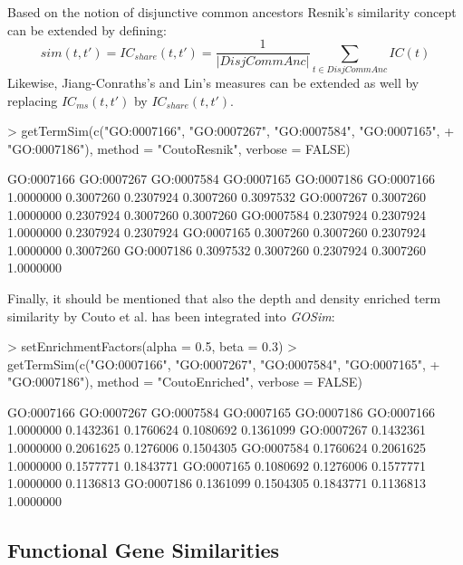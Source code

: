 \documentclass[12pt,a4paper]{article}
\begin{document}
Based on the notion of disjunctive common ancestors Resnik's similarity concept can be extended by defining:
\begin{equation}
sim(t,t') = IC_{share}(t,t') = \frac{1}{|DisjCommAnc|}\sum_{t\in DisjCommAnc} IC(t)
\end{equation}
Likewise, Jiang-Conraths's and Lin's measures can be extended as well by replacing $IC_{ms}(t,t')$ by $IC_{share}(t,t')$.
\begin{Schunk}
\begin{Sinput}
> getTermSim(c("GO:0007166", "GO:0007267", "GO:0007584", "GO:0007165", 
+     "GO:0007186"), method = "CoutoResnik", verbose = FALSE)
\end{Sinput}
\begin{Soutput}
           GO:0007166 GO:0007267 GO:0007584 GO:0007165 GO:0007186
GO:0007166  1.0000000  0.3007260  0.2307924  0.3007260  0.3097532
GO:0007267  0.3007260  1.0000000  0.2307924  0.3007260  0.3007260
GO:0007584  0.2307924  0.2307924  1.0000000  0.2307924  0.2307924
GO:0007165  0.3007260  0.3007260  0.2307924  1.0000000  0.3007260
GO:0007186  0.3097532  0.3007260  0.2307924  0.3007260  1.0000000
\end{Soutput}
\end{Schunk}

Finally, it should be mentioned that also the depth and density enriched term similarity by Couto et al. \cite{Couto2003FuSSiMeg} has been integrated into \emph{GOSim}:
\begin{Schunk}
\begin{Sinput}
> setEnrichmentFactors(alpha = 0.5, beta = 0.3)
> getTermSim(c("GO:0007166", "GO:0007267", "GO:0007584", "GO:0007165", 
+     "GO:0007186"), method = "CoutoEnriched", verbose = FALSE)
\end{Sinput}
\begin{Soutput}
           GO:0007166 GO:0007267 GO:0007584 GO:0007165 GO:0007186
GO:0007166  1.0000000  0.1432361  0.1760624  0.1080692  0.1361099
GO:0007267  0.1432361  1.0000000  0.2061625  0.1276006  0.1504305
GO:0007584  0.1760624  0.2061625  1.0000000  0.1577771  0.1843771
GO:0007165  0.1080692  0.1276006  0.1577771  1.0000000  0.1136813
GO:0007186  0.1361099  0.1504305  0.1843771  0.1136813  1.0000000
\end{Soutput}
\end{Schunk}

\subsection{Functional Gene Similarities}
\end{document}
